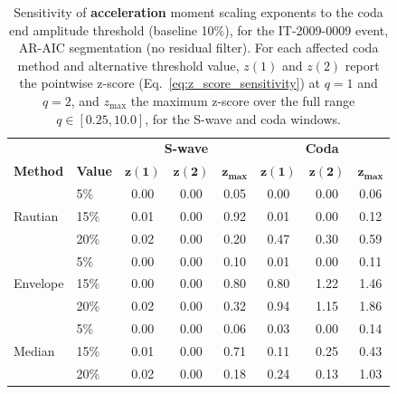 \begin{table}[htbp]
\centering
\small
\begin{tabular}{llcccccc}
\toprule
& & \multicolumn{3}{c}{\textbf{S-wave}} & \multicolumn{3}{c}{\textbf{Coda}} \\
\textbf{Method} & \textbf{Value} & $\bm{z(1)}$ & $\bm{z(2)}$ & $\bm{z_{\max}}$ & $\bm{z(1)}$ & $\bm{z(2)}$ & $\bm{z_{\max}}$ \\
\midrule
\multirow{3}{*}{Rautian}
& 5\% & 0.00 & 0.00 & 0.05 & 0.00 & 0.00 & 0.06 \\
& 15\% & 0.01 & 0.00 & 0.92 & 0.01 & 0.00 & 0.12 \\
& 20\% & 0.02 & 0.00 & 0.20 & 0.47 & 0.30 & 0.59 \\
\midrule
\multirow{3}{*}{Envelope}
& 5\% & 0.00 & 0.00 & 0.10 & 0.01 & 0.00 & 0.11 \\
& 15\% & 0.00 & 0.00 & 0.80 & 0.80 & 1.22 & 1.46 \\
& 20\% & 0.02 & 0.00 & 0.32 & 0.94 & 1.15 & 1.86 \\
\midrule
\multirow{3}{*}{Median}
& 5\% & 0.00 & 0.00 & 0.06 & 0.03 & 0.00 & 0.14 \\
& 15\% & 0.01 & 0.00 & 0.71 & 0.11 & 0.25 & 0.43 \\
& 20\% & 0.02 & 0.00 & 0.18 & 0.24 & 0.13 & 1.03 \\
\bottomrule
\end{tabular}
\caption{Sensitivity of \textbf{acceleration} moment scaling exponents to the coda end amplitude threshold (baseline 10\%), for the IT-2009-0009 event, AR-AIC segmentation (no residual filter). For each affected coda method and alternative threshold value, $z(1)$ and $z(2)$ report the pointwise z-score (Eq.~\eqref{eq:z_score_sensitivity}) at $q=1$ and $q=2$, and $z_{\max}$ the maximum z-score over the full range $q \in [0.25, 10.0]$, for the S-wave and coda windows.}
\label{tab:coda_threshold_sensitivity_end_ar_aic_acc_nothresh_laquila}
\end{table}